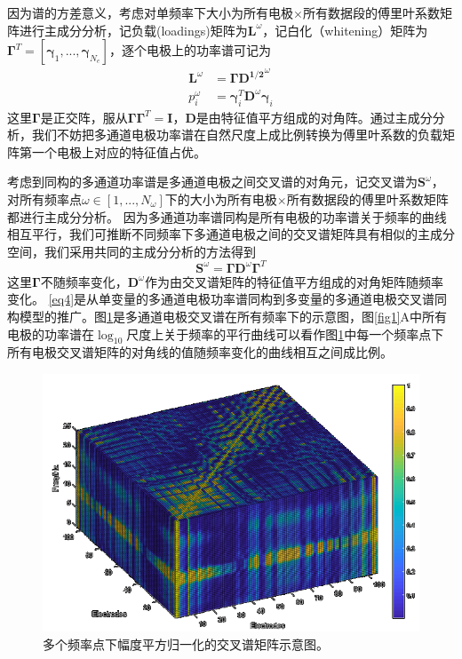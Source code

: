 因为谱的方差意义，考虑对单频率下大小为所有电极$\times$所有数据段的傅里叶系数矩阵进行主成分分析，记负载(loadings)矩阵为$\mathbf{L}^\omega$，记白化（whitening）矩阵为$\mathbf{\Gamma}^T=[\mathbf{\gamma}_1,...,\mathbf{\gamma}_{N_e}]$，逐个电极上的功率谱可记为
\begin{equation}\label{eq3}
\begin{split}
\mathbf{L}^\omega& =\mathbf{\Gamma}\mathbf{D^{1/2}}^\omega\\
p_i^\omega& =\mathbf{\gamma}_i^T\mathbf{D}^\omega\mathbf{\gamma}_i
\end{split}
\end{equation}
这里$\mathbf{\Gamma}$是正交阵，服从$\mathbf{\Gamma}\mathbf{\Gamma}^T=\mathbf{I}$，$\mathbf{D}$是由特征值平方组成的对角阵。通过主成分分析，我们不妨把多通道电极功率谱在自然尺度上成比例转换为傅里叶系数的负载矩阵第一个电极上对应的特征值占优。

考虑到同构的多通道功率谱是多通道电极之间交叉谱的对角元，记交叉谱为$\mathbf{S}^\omega$，对所有频率点$\omega\in[1,...,N_\omega]$下的大小为所有电极$\times$所有数据段的傅里叶系数矩阵都进行主成分分析。 因为多通道功率谱同构是所有电极的功率谱关于频率的曲线相互平行，我们可推断不同频率下多通道电极之间的交叉谱矩阵具有相似的主成分空间，我们采用共同的主成分分析的方法得到
\begin{equation}\label{eq4}
\mathbf{S}^\omega=\mathbf{\Gamma}\mathbf{D}^\omega\mathbf{\Gamma}^T
\end{equation}
这里$\mathbf{\Gamma}$不随频率变化，$\mathbf{D}^\omega$作为由交叉谱矩阵的特征值平方组成的对角矩阵随频率变化。 \eqref{eq4}是从单变量的多通道电极功率谱同构到多变量的多通道电极交叉谱同构模型的推广。图\ref{fig2}是多通道电极交叉谱在所有频率下的示意图，图\ref{fig1}A中所有电极的功率谱在$\log_{10}$尺度上关于频率的平行曲线可以看作图\ref{fig2}中每一个频率点下所有电极交叉谱矩阵的对角线的值随频率变化的曲线相互之间成比例。

\begin{figure}
\includegraphics[width=15cm]{pic/palos/spectratensor.png}
\caption{多个频率点下幅度平方归一化的交叉谱矩阵示意图。}
\label{fig2}
\end{figure}

